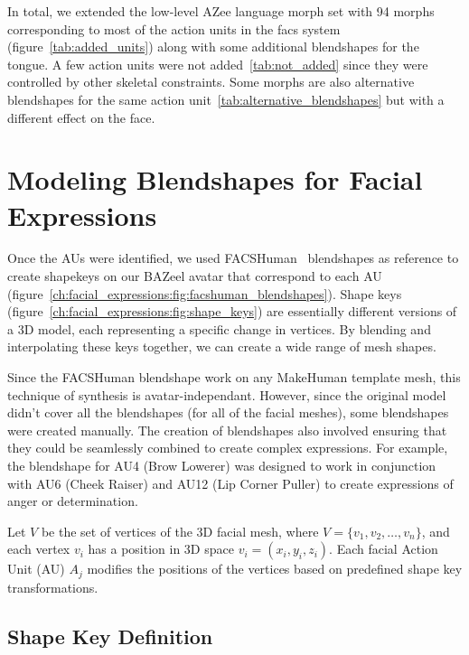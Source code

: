 \documentclass[../../main]{subfiles}
\begin{document}
In total, we extended the low-level AZee language morph set with 94 morphs corresponding to most of the action units in the \gls{facs} system (figure~\ref{tab:added_units}) along with some additional blendshapes for the tongue. A few action units were not added~\ref{tab:not_added} since they were controlled by other skeletal constraints. Some morphs are also alternative blendshapes for the same action unit~\ref{tab:alternative_blendshapes} but with a different effect on the face.

\section{Modeling Blendshapes for Facial Expressions}
\label{ch:facial_expressions:blendshape_creation}

Once the AUs were identified, we used FACSHuman~\cite{gilbert2021facshuman} blendshapes as reference to create shapekeys on our BAZeel avatar that correspond to each AU (figure~\ref{ch:facial_expressions:fig:facshuman_blendshapes}). Shape keys (figure~\ref{ch:facial_expressions:fig:shape_keys}) are essentially different versions of a 3D model, each representing a specific change in vertices. By blending and interpolating these keys together, we can create a wide range of mesh shapes.

Since the FACSHuman blendshape work on any MakeHuman template mesh, this technique of synthesis is avatar-independant. However, since the original model didn't cover all the blendshapes (for all of the facial meshes), some blendshapes were created manually. The creation of blendshapes also involved ensuring that they could be seamlessly combined to create complex expressions. For example, the blendshape for AU4 (Brow Lowerer) was designed to work in conjunction with AU6 (Cheek Raiser) and AU12 (Lip Corner Puller) to create expressions of anger or determination.

Let \( V \) be the set of vertices of the 3D facial mesh, where \( V = \{ v_1, v_2, \dots, v_n \} \), and each vertex \( v_i \) has a position in 3D space \( v_i = (x_i, y_i, z_i) \). Each facial Action Unit (AU) \( A_j \) modifies the positions of the vertices based on predefined shape key transformations.

\subsection{Shape Key Definition}
\label{ch:facial_expressions:blendshape_creation:shape_key_definition}
\end{document}
